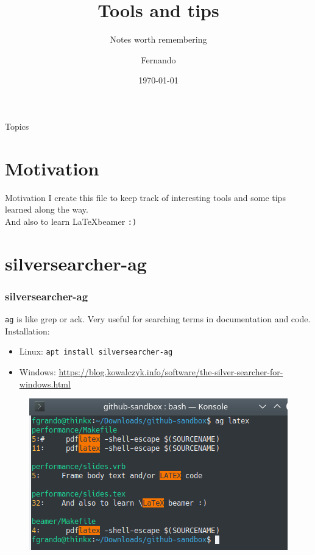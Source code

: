 \documentclass[pdf]{beamer}
\title{Tools and tips}
\subtitle{Notes worth remembering}
\author{Fernando}
\institute{\href{https://github.com/fgrando}{\emph{github}}}
\date{\today}
\newcommand{\code}[1]{\colorbox{light-gray}{\texttt{#1}}}
\newcommand{\mono}[1]{\texttt{#1}}
\begin{document}
\begin{frame}
    \titlepage
\end{frame}

\begin{frame}{Topics}
  \tableofcontents
\end{frame}

\section{Motivation}
\begin{frame}{Motivation}
    I create this file to keep track of interesting tools and some tips learned
    along the way.\\
    And also to learn \LaTeX  beamer \mono{:)}
\end{frame}


\section{silversearcher-ag}
\begin{frame}
  \frametitle{silversearcher-ag}
  \code{ag} is like grep or ack. Very useful for searching terms in documentation and code.
  Installation:
  \begin{itemize}
    \item Linux: \mono{apt install silversearcher-ag}
    \item Windows: \url{https://blog.kowalczyk.info/software/the-silver-searcher-for-windows.html}
  \end{itemize}
  \begin{figure}
    \includegraphics[scale=0.4]{data/ag-terminal-linuxpng.png}
  \end{figure}
\end{frame}
\end{document}
